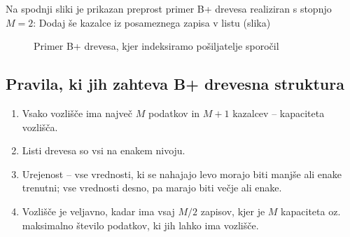 \documentclass[a4paper,12pt,openright]{book}
\begin{document}
        Na spodnji sliki je prikazan preprost primer B+ drevesa realiziran s stopnjo $M=2$:
        \colorbox{BurntOrange}{Dodaj še kazalce iz posameznega zapisa v listu (slika)}
        
        \begin{figure}[h]
        
\begin{center}
\end{center}

            \caption{Primer B+ drevesa, kjer indeksiramo pošiljatelje sporočil}
            \label{sl:mindmap}
        \end{figure}

        

        \newpage
        \subsection{Pravila, ki jih zahteva B+ drevesna struktura}
        \begin{enumerate}
            \item Vsako vozlišče ima največ $M$ podatkov in $M+1$ kazalcev – kapaciteta vozlišča.
            \item Listi drevesa so vsi na enakem nivoju.
            \item Urejenost – vse vrednosti, ki se nahajajo levo morajo biti manjše ali enake trenutni; vse vrednosti desno, pa marajo biti večje ali enake.
            \item Vozlišče je veljavno, kadar ima vsaj $M/2$ zapisov, kjer je $M$ kapaciteta oz. maksimalno število podatkov, ki jih lahko ima vozlišče.
        \end{enumerate}
\end{document}
